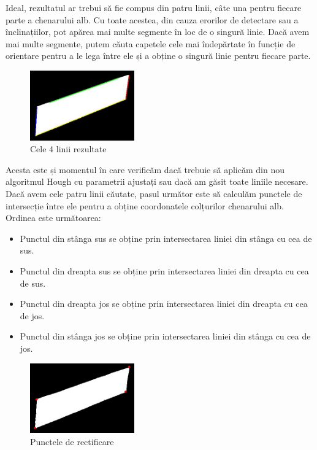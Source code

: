 \documentclass[a4paper,12pt]{report}
\begin{document}
Ideal, rezultatul ar trebui să fie compus din patru linii, câte una pentru fiecare parte a chenarului alb. Cu toate acestea, din cauza erorilor de detectare sau a înclinațiilor, pot apărea mai multe segmente în loc de o singură linie. Dacă avem mai multe segmente, putem căuta capetele cele mai îndepărtate în funcție de orientare pentru a le lega între ele și a obține o singură linie pentru fiecare parte.

\begin{figure}[h]
    \centering
    \includegraphics[width=0.4\textwidth]{images/sorted_lines.jpg}
    \caption{Cele 4 linii rezultate}
\end{figure}
\FloatBarrier

Acesta este și momentul în care verificăm dacă trebuie să aplicăm din nou algoritmul Hough cu parametrii ajustați sau dacă am găsit toate liniile necesare. Dacă avem cele patru linii căutate, pasul următor este să calculăm punctele de intersecție între ele pentru a obține coordonatele colțurilor chenarului alb. Ordinea este următoarea:
\begin{itemize}[itemsep=5pt, parsep=0pt]
    \item Punctul din stânga sus se obține prin intersectarea liniei din stânga cu cea de sus.
    \item Punctul din dreapta sus se obține prin intersectarea liniei din dreapta cu cea de sus.
    \item Punctul din dreapta jos se obține prin intersectarea liniei din dreapta cu cea de jos.
    \item Punctul din stânga jos se obține prin intersectarea liniei din stânga cu cea de jos.
\end{itemize}

\begin{figure}[h]
    \centering
    \includegraphics[width=0.4\textwidth]{images/points.jpg}
    \caption{Punctele de rectificare}
\end{figure}
\FloatBarrier
\end{document}

